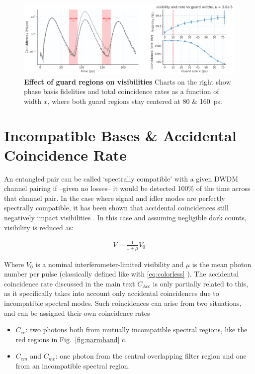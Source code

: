 \documentclass[11pt]{caltech_thesis} %
\begin{document}
\hypertarget{fig:guard_scan}{%
\begin{figure}
\centering
\includegraphics[width=1\textwidth,height=\textheight]{./chapter_05/figs/guard_scan_light.pdf}
\caption[{Effect of guard regions on visibilities}]{\textbf{Effect of guard regions on visibilities} Charts on the right show phase basis fidelities and total coincidence rates as a function of width $x$, where both guard regions stay centered at 80 \& 160~ps.}
\label{fig:guard_scan}
\end{figure}
}

\hypertarget{incompatible-bases-accidental-coincidence-rate}{%
\section{Incompatible Bases \& Accidental Coincidence Rate}\label{incompatible-bases-accidental-coincidence-rate}}

An entangled pair can be called `spectrally compatible' with a given DWDM channel pairing if --given no losses-- it would be detected 100\% of the time across that channel pair. In the case where signal and idler modes are perfectly spectrally compatible, it has been shown that accidental coincidences still negatively impact visibilities \autocite{Kim2022}. In this case and assuming negligible dark counts, visibility is reduced as:

$$
\begin{aligned}
V = \frac{1}{1+\mu}V_0
\end{aligned}
$$

Where $V_0$ is a nominal interferometer-limited visibility \autocite{Kim2022} and $\mu$ is the mean photon number per pulse (classically defined like with \ref{eq:colorless} ). The accidental coincidence rate discussed in the main text $C_{Acc}$ is only partially related to this, as it specifically takes into account only accidental coincidences due to incompatible spectral modes. Such coincidences can arise from two situations, and can be assigned their own coincidence rates

\begin{itemize}
\tightlist
\item
  $C_{ee}$: two photons both from mutually incompatible spectral regions, like the red regions in Fig.~\ref{fig:narroband} c.
\item
  $C_{em}$ and $C_{me}$: one photon from the central overlapping filter region and one from an incompatible spectral region.
\end{itemize}
\end{document}
